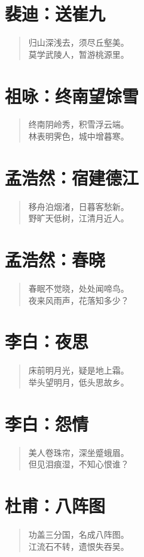 \documentclass[12pt,oneside]{book}
\newenvironment{shici}{
\begin{verse}
\centering\large\hspace{12pt}}
{\end{verse}}
\begin{document}
\chapter{裴迪：送崔九}
\begin{shici}
归山深浅去，须尽丘壑美。\\
莫学武陵人，暂游桃源里。
\end{shici}

\chapter{祖咏：终南望馀雪}
\begin{shici}
终南阴岭秀，积雪浮云端。\\
林表明霁色，城中增暮寒。
\end{shici}

\chapter{孟浩然：宿建德江}
\begin{shici}
移舟泊烟渚，日暮客愁新。\\
野旷天低树，江清月近人。
\end{shici}

\chapter{孟浩然：春晓}
\begin{shici}
春眠不觉晓，处处闻啼鸟。\\
夜来风雨声，花落知多少？
\end{shici}

\chapter{李白：夜思}
\begin{shici}
床前明月光，疑是地上霜。\\
举头望明月，低头思故乡。
\end{shici}

\chapter{李白：怨情}
\begin{shici}
美人卷珠帘，深坐蹙蛾眉。\\
但见泪痕湿，不知心恨谁？
\end{shici}

\chapter{杜甫：八阵图}
\begin{shici}
功盖三分国，名成八阵图。\\
江流石不转，遗恨失吞吴。
\end{shici}
\end{document}
